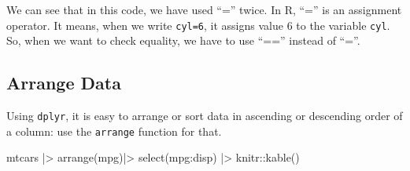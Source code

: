 \documentclass[
  letterpaper,
  paper =a4,
  twoside,
  openright,
  headsepline,
  footsepline,
  listof = totocnumbered,
  chapterprefix = true,
  firstiscover]{scrbook}
\newenvironment{Shaded}{\begin{snugshade}}{\end{snugshade}}
\newcommand{\FunctionTok}[1]{\textcolor[rgb]{0.28,0.35,0.67}{#1}}
\newcommand{\NormalTok}[1]{\textcolor[rgb]{0.00,0.23,0.31}{#1}}
\newcommand{\SpecialCharTok}[1]{\textcolor[rgb]{0.37,0.37,0.37}{#1}}
\begin{document}
We can see that in this code, we have used ``='' twice. In R, ``='' is
an assignment operator. It means, when we write \texttt{cyl=6}, it
assigns value 6 to the variable \texttt{cyl}. So, when we want to check
equality, we have to use ``=='' instead of ``=''.

\hypertarget{arrange-data}{%
\subsection{Arrange Data}\label{arrange-data}}

Using \texttt{dplyr}, it is easy to arrange or sort data in ascending or
descending order of a column: use the \texttt{arrange} function for
that.

\begin{Shaded}
\begin{Highlighting}[numbers=left,,]
\NormalTok{mtcars }\SpecialCharTok{|\textgreater{}} \FunctionTok{arrange}\NormalTok{(mpg)}\SpecialCharTok{|\textgreater{}} \FunctionTok{select}\NormalTok{(mpg}\SpecialCharTok{:}\NormalTok{disp) }\SpecialCharTok{|\textgreater{}}\NormalTok{ knitr}\SpecialCharTok{::}\FunctionTok{kable}\NormalTok{()}
\end{Highlighting}
\end{Shaded}
\end{document}
